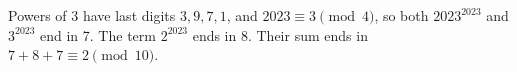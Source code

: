 Powers of 3 have last digits $3,9,7,1$, and $2023\equiv3\pmod4$, so both $2023^{2023}$ and $3^{2023}$ end in 7. The term $2^{2023}$ ends in 8. Their sum ends in $7+8+7\equiv\boxed2\pmod{10}$.
